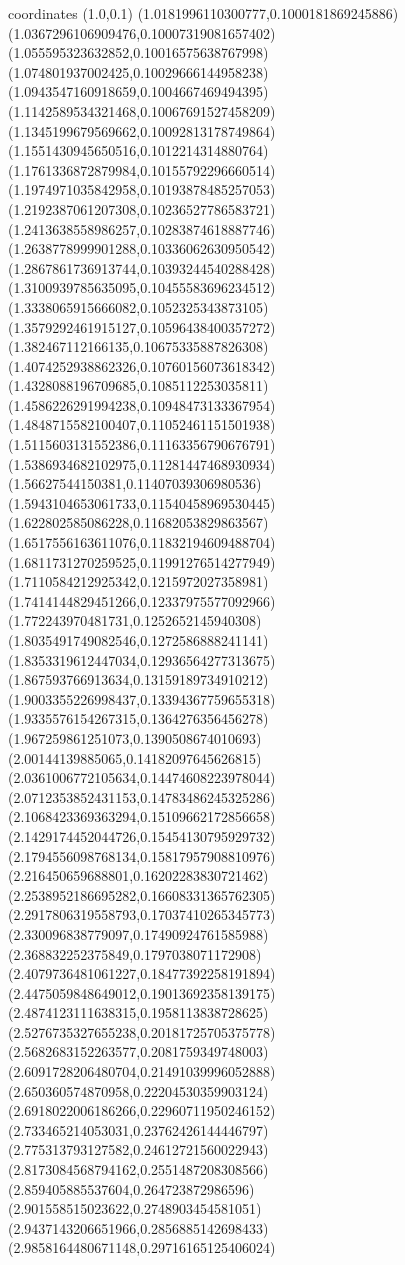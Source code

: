 coordinates {%
(1.0,0.1)
(1.0181996110300777,0.1000181869245886)
(1.0367296106909476,0.10007319081657402)
(1.055595323632852,0.10016575638767998)
(1.074801937002425,0.10029666144958238)
(1.0943547160918659,0.1004667469494395)
(1.1142589534321468,0.10067691527458209)
(1.1345199679569662,0.10092813178749864)
(1.1551430945650516,0.1012214314880764)
(1.1761336872879984,0.10155792296660514)
(1.1974971035842958,0.10193878485257053)
(1.2192387061207308,0.10236527786583721)
(1.2413638558986257,0.10283874618887746)
(1.2638778999901288,0.10336062630950542)
(1.2867861736913744,0.10393244540288428)
(1.3100939785635095,0.10455583696234512)
(1.3338065915666082,0.1052325343873105)
(1.3579292461915127,0.10596438400357272)
(1.382467112166135,0.10675335887826308)
(1.4074252938862326,0.10760156073618342)
(1.4328088196709685,0.1085112253035811)
(1.4586226291994238,0.10948473133367954)
(1.4848715582100407,0.11052461151501938)
(1.5115603131552386,0.11163356790676791)
(1.5386934682102975,0.11281447468930934)
(1.56627544150381,0.11407039306980536)
(1.5943104653061733,0.11540458969530445)
(1.622802585086228,0.11682053829863567)
(1.6517556163611076,0.11832194609488704)
(1.6811731270259525,0.11991276514277949)
(1.7110584212925342,0.1215972027358981)
(1.7414144829451266,0.12337975577092966)
(1.772243970481731,0.1252652145940308)
(1.8035491749082546,0.1272586888241141)
(1.8353319612447034,0.12936564277313675)
(1.867593766913634,0.13159189734910212)
(1.9003355226998437,0.13394367759655318)
(1.9335576154267315,0.1364276356456278)
(1.967259861251073,0.1390508674010693)
(2.00144139885065,0.14182097645626815)
(2.0361006772105634,0.14474608223978044)
(2.0712353852431153,0.14783486245325286)
(2.1068423369363294,0.15109662172856658)
(2.1429174452044726,0.15454130795929732)
(2.1794556098768134,0.15817957908810976)
(2.216450659688801,0.16202283830721462)
(2.2538952186695282,0.16608331365762305)
(2.2917806319558793,0.17037410265345773)
(2.330096838779097,0.17490924761585988)
(2.368832252375849,0.1797038071172908)
(2.4079736481061227,0.18477392258191894)
(2.4475059848649012,0.19013692358139175)
(2.4874123111638315,0.1958113838728625)
(2.5276735327655238,0.20181725705375778)
(2.5682683152263577,0.2081759349748003)
(2.6091728206480704,0.21491039996052888)
(2.650360574870958,0.22204530359903124)
(2.6918022006186266,0.22960711950246152)
(2.733465214053031,0.23762426144446797)
(2.775313793127582,0.24612721560022943)
(2.8173084568794162,0.2551487208308566)
(2.859405885537604,0.264723872986596)
(2.901558515023622,0.2748903454581051)
(2.9437143206651966,0.2856885142698433)
(2.9858164480671148,0.29716165125406024)
}
